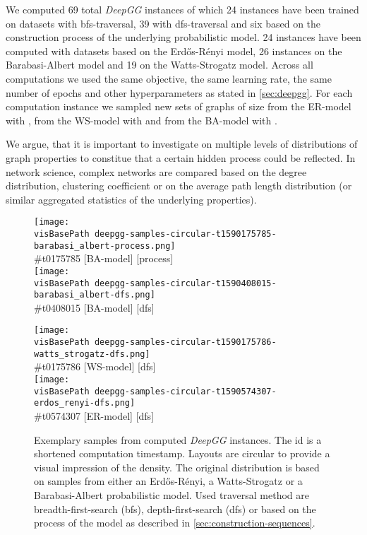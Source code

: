 \documentclass{article}
\newcommand{\visBasePath}[0]{vis/}
\begin{document}
We computed 69 total \textit{DeepGG} instances of which 24 instances have been trained on datasets with bfs-traversal, 39 with dfs-traversal and six based on the construction process of the underlying probabilistic model.
24 instances have been computed with datasets based on the Erdős-Rényi model, 26 instances on the Barabasi-Albert model and 19 on the Watts-Strogatz model.
Across all computations we used the same objective, the same learning rate, the same number of epochs and other hyperparameters as stated in \autoref{sec:deepgg}.
For each computation instance we sampled new sets of graphs of size  from the ER-model with , from the WS-model with  and from the BA-model with .

We argue, that it is important to investigate on multiple levels of distributions of graph properties to constitue that a certain hidden process could be reflected.
In network science, complex networks are compared based on the degree distribution, clustering coefficient \cite{watts1998collective} or on the average path length distribution (or similar aggregated statistics of the underlying properties).

\begin{figure*}
  \begin{minipage}[c]{0.49\linewidth}
	\centering
    \texttt{[image: \\visBasePath deepgg-samples-circular-t1590175785-barabasi\_albert-process.png]}\\
	{\color{gray}\small\#t0175785 [BA-model] [process]}\protect\\
    \texttt{[image: \\visBasePath deepgg-samples-circular-t1590408015-barabasi\_albert-dfs.png]}\\
	{\color{gray}\small\#t0408015 [BA-model] [dfs]}
  \end{minipage}\hfill
  \begin{minipage}[c]{0.49\linewidth}
	\centering
    \texttt{[image: \\visBasePath deepgg-samples-circular-t1590175786-watts\_strogatz-dfs.png]}\\
	{\color{gray}\small\#t0175786 [WS-model] [dfs]}\protect\\
    \texttt{[image: \\visBasePath deepgg-samples-circular-t1590574307-erdos\_renyi-dfs.png]}\\
	{\color{gray}\small\#t0574307 [ER-model] [dfs]}\protect\\
  \end{minipage}
  \caption{
    Exemplary samples from computed \textit{DeepGG} instances.
	The id is a shortened computation timestamp.
	Layouts are circular to provide a visual impression of the density.
	The original distribution is based on samples from either an Erdős-Rényi, a Watts-Strogatz or a Barabasi-Albert probabilistic model.
	Used traversal method are breadth-first-search (bfs), depth-first-search (dfs) or based on the process of the model as described in \autoref{sec:construction-sequences}.
  } \label{fig:samples}
\end{figure*}
\end{document}
